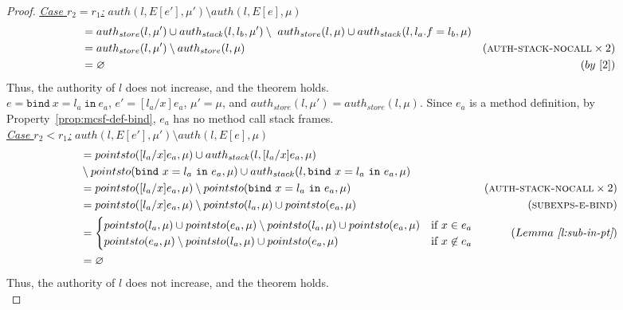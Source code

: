 \documentclass{llncs}
\newcommand{\keywadj}[1]{\mathtt{#1}}
\newcommand{\keyw}[1]{\keywadj{#1}~}
\begin{document}
\begin{proof}
\noindent\underline{\underline{\textit{Case $r_2 = r_1$:}}} $auth(l, E[e'], \mu') \setminus auth(l, E[e], \mu)$
\vspace{-7pt}
\begin{align*}
&= auth_{store}(l, \mu') \cup auth_{stack}(l, l_b, \mu') \setminus~auth_{store}(l, \mu) \cup auth_{stack}(l, l_a.f = l_b, \mu)\\
&= auth_{store}(l, \mu') \setminus auth_{store}(l, \mu) & (\textsc{auth-stack-nocall} \times 2)\\
&= \varnothing & (by~[2])
\end{align*}
Thus, the authority of $l$ does not increase, and the theorem holds.\\


\noindent{}
$e = \keyw{bind} x = l_a~\keyw{in} e_a$, $e' = [l_a/x]e_a$, $\mu' = \mu$, and $auth_{store}(l, \mu') = auth_{store}(l, \mu)$. Since $e_a$ is a method definition, by Property~\ref{prop:mcsf-def-bind}, $e_a$ has no method call stack frames.\\

\noindent\underline{\underline{\textit{Case $r_2 < r_1$:}}}
$auth(l, E[e'], \mu') \setminus auth(l, E[e], \mu)$
\vspace{-7pt}
\begin{align*}
&= pointsto([l_a/x]e_a, \mu) \cup auth_{stack}(l, [l_a/x]e_a, \mu)\\
&\setminus pointsto(\keyw{bind} x = l_a~\keyw{in} e_a, \mu) \cup auth_{stack}(l, \keyw{bind} x = l_a~\keyw{in} e_a, \mu)\\
&= pointsto([l_a/x]e_a, \mu) \setminus pointsto(\keyw{bind} x = l_a~\keyw{in} e_a, \mu) & (\textsc{auth-stack-nocall} \times 2)\\
&= pointsto([l_a/x]e_a, \mu) \setminus pointsto(l_a, \mu) \cup pointsto(e_a, \mu) & (\textsc{subexps-e-bind})\\
&=
\begin{cases}
    pointsto(l_a, \mu) \cup pointsto(e_a, \mu) \setminus pointsto(l_a, \mu) \cup pointsto(e_a, \mu) & \text{if } x \in e_a\\
    pointsto(e_a, \mu) \setminus pointsto(l_a, \mu) \cup pointsto(e_a, \mu) & \text{if } x \not\in e_a
\end{cases} & (Lemma~\textit{\ref{l:sub-in-pt}})\\
&= \varnothing
\end{align*}
Thus, the authority of $l$ does not increase, and the theorem holds.\\


\end{proof}
\end{document}
